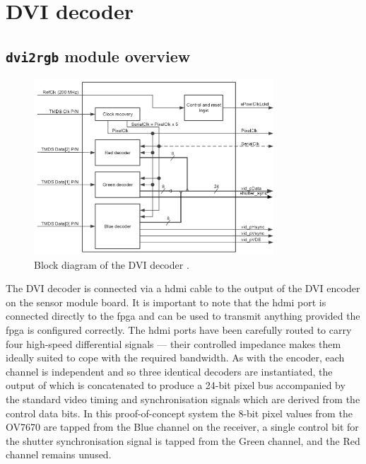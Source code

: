 \section{DVI decoder}

\subsection{\texttt{dvi2rgb} module overview}
\begin{figure}
  \centering
  \includegraphics[width=0.8\textwidth]{./img/dvi2rgb.png}\par
  \caption{Block diagram of the DVI decoder \cite{dvi2rgb}.}
  \label{fig:dvi2rgb}
\end{figure}

The DVI decoder is connected via a \gls{hdmi} cable to the output of the DVI encoder on the sensor module board. It is important to note that the \gls{hdmi} port is connected directly to the \gls{fpga} and can be used to transmit anything provided the \gls{fpga} is configured correctly. The \gls{hdmi} ports have been carefully routed to carry four high-speed differential signals --- their controlled impedance makes them ideally suited to cope with the required bandwidth. As with the encoder, each channel is independent and so three identical decoders are instantiated, the output of which is concatenated to produce a 24-bit pixel bus accompanied by the standard video timing and synchronisation signals which are derived from the control data bits. In this proof-of-concept system the 8-bit pixel values from the OV7670 are tapped from the Blue channel on the receiver, a single control bit for the shutter synchronisation signal is tapped from the Green channel, and the Red channel remains unused.

